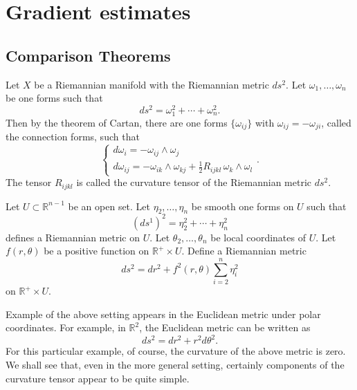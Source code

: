 
\chapter{Gradient estimates} 
\section{Comparison Theorems}

Let $X$ be a Riemannian manifold with the Riemannian metric $ds^2$. Let $ \omega_1, \ldots, \omega_n $ be one forms such that 
%
\[ d s^2 = \omega ^2_1 + \cdots + \omega ^2_n. \]
%
Then by the theorem of Cartan, there are one forms $ \{ \omega_{ij} \} $ with $ \omega_{ij} = - \omega _{ji} $, called the connection forms, such that 
%
\[ \left\{ \begin{array}{ll} d \omega_i = - \omega_{ij} \wedge \omega_j \\
d \omega _{ij} = - \omega _{ik} \wedge \omega_{kj} + \frac{1}{2} R_{ij kl} \, \omega _k \wedge \omega _l \end{array} \right. .\]
%
The tensor $R_{ij k l} $ is called the curvature tensor of the Riemannian metric $ d s^2 $.

Let $ U \subset \mathbb{R} ^{n-1} $ be an open set. Let $ \eta _2 , \ldots, \eta _n $ be smooth one forms on $ U$ such that  
%
\[ (ds^1)^2 = \eta ^2_2 + \cdots + \eta ^2_n \]
defines a Riemannian metric on $U$. Let $ \theta _2, \ldots, \theta _n $ be local coordinates of $U$. Let $ f (r, \theta) $ be a positive function on $ \mathbb{R}^+ \times U$. Define a Riemannian metric 
%
\[ ds^2 = d r ^2 + f^2 (r, \theta) \sum ^n _{i=2} \eta ^2 _i \]
on $ \mathbb{R} ^+ \times U$. 



 Example of the above setting appears in the Euclidean metric under polar coordinates. For example, in $ \mathbb{R} ^2$, the Euclidean metric can be written as 
%
\[ d s^2 = d r^2 + r ^2 d \theta^2.\]
For this particular example,
of course, the curvature of the above metric is zero. We shall see that, even in the more general 
setting, certainly components of the curvature tensor appear to be  quite simple.

